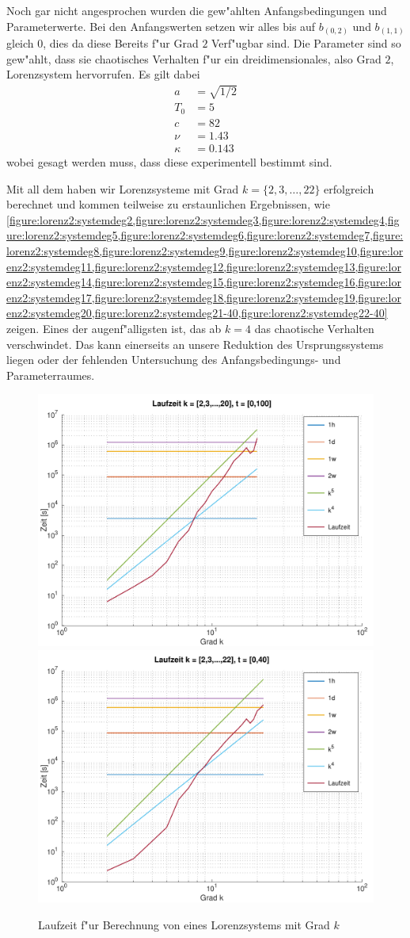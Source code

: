 Noch gar nicht angesprochen wurden die gew"ahlten Anfangsbedingungen und 
Parameterwerte. Bei den Anfangswerten setzen wir alles bis auf $b_{(0,2)}$ und 
$b_{(1,1)}$ gleich $0$, dies da diese Bereits f"ur Grad $2$ Verf"ugbar sind. 
Die Parameter sind so gew"ahlt, dass sie chaotisches Verhalten f"ur ein 
dreidimensionales, also Grad $2$, Lorenzsystem hervorrufen. Es gilt dabei
\begin{align*}
	a &= \sqrt{1/2} \\
	T_0 &= 5 \\
	c &= 82 \\
	\nu &= 1.43 \\
	\kappa &= 0.143
\end{align*}
wobei gesagt werden muss, dass diese experimentell bestimmt sind.

Mit all dem haben wir Lorenzsysteme mit Grad $k = \{2,3,\dots,22\}$ erfolgreich 
berechnet und kommen teilweise zu erstaunlichen Ergebnissen, wie 
\cref{figure:lorenz2:systemdeg2,figure:lorenz2:systemdeg3,figure:lorenz2:systemdeg4,figure:lorenz2:systemdeg5,figure:lorenz2:systemdeg6,figure:lorenz2:systemdeg7,figure:lorenz2:systemdeg8,figure:lorenz2:systemdeg9,figure:lorenz2:systemdeg10,figure:lorenz2:systemdeg11,figure:lorenz2:systemdeg12,figure:lorenz2:systemdeg13,figure:lorenz2:systemdeg14,figure:lorenz2:systemdeg15,figure:lorenz2:systemdeg16,figure:lorenz2:systemdeg17,figure:lorenz2:systemdeg18,figure:lorenz2:systemdeg19,figure:lorenz2:systemdeg20,figure:lorenz2:systemdeg21-40,figure:lorenz2:systemdeg22-40}
zeigen. Eines der augenf"alligsten ist, das ab $k = 4$ das chaotische Verhalten 
verschwindet. Das kann einerseits an unsere Reduktion des Ursprungssystems 
liegen oder der fehlenden Untersuchung des Anfangsbedingungs- und 
Parameterraumes.

\begin{figure}
	\centering
	\includegraphics[width=0.49\linewidth]{lorenz2/03-images/timing_100}
	\includegraphics[width=0.49\linewidth]{lorenz2/03-images/timing_40}
	\caption{Laufzeit f"ur Berechnung von eines Lorenzsystems mit Grad $k$}
	\label{figure:lorenz2:timings}
\end{figure}

